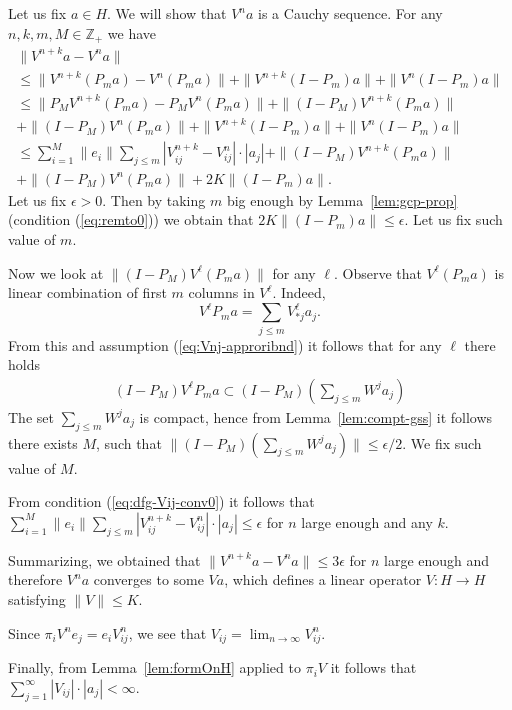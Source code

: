 Let us fix $a \in H$. We will show that $V^n a$ is a Cauchy sequence. For any $n,k,m,M \in \mathbb{Z}_+$ we have
\begin{multline*}
  \|V^{n+k}a - V^n a\|\\\leq
  \|V^{n+k} (P_m a) - V^{n} (P_m a) \| + \|V^{n+k} (I-P_m) a\| +  \|V^{n} (I-P_m) a\| \\
   \leq \|P_M V^{n+k} (P_m a) - P_MV^{n} (P_m a) \| + \|(I-P_M)V^{n+k} (P_m a) \| \\
    +  \|(I-P_M)V^{n} (P_m a) \|
    + \|V^{n+k} (I-P_m) a\| +  \|V^{n} (I-P_m) a\| \\
    \leq \sum_{i=1}^M \|e_i\| \sum_{j\leq m} |V^{n+k}_{ij}-V^n_{ij}| \cdot |a_j|   + \|(I-P_M)V^{n+k} (P_m a) \| \\
    +  \|(I-P_M)V^{n} (P_m a) \| + 2 K \|(I-P_m)a\|.
\end{multline*}
Let us fix $\epsilon >0$. Then by taking $m$ big enough by Lemma~\ref{lem:gcp-prop} (condition (\ref{eq:remto0})) we obtain
that $2 K \|(I-P_m)a\| \leq \epsilon$. Let us fix such value of $m$.


Now we look at  $\|(I-P_M)V^{\ell} (P_m a) \|$ for any $\ell$. Observe that  $V^{\ell} (P_m a)$ is linear combination
of first $m$ columns in $V^{\ell}$. Indeed,
\begin{equation*}
  V^{\ell}P_m a = \sum_{j \leq m} V^{\ell}_{\ast j} a_j.
\end{equation*}
From this and assumption (\ref{eq:Vnj-approribnd}) it follows that for any $\ell$ there holds
\begin{eqnarray*}
  (I-P_M)  V^{\ell}P_m a  \subset (I-P_M) \left( \sum_{j\leq m} W^j a_j \right)
\end{eqnarray*}
The set $\sum_{j\leq m} W^j a_j$ is compact, hence from Lemma~\ref{lem:compt-gss} it follows there exists $M$, such that $\|(I-P_M) \left( \sum_{j\leq m} W^j a_j \right)\| \leq \epsilon/2$. We fix such value of $M$.

From condition (\ref{eq:dfg-Vij-conv0}) it follows that $ \sum_{i=1}^M \|e_i\| \sum_{j\leq m} |V^{n+k}_{ij}-V^n_{ij}| \cdot |a_j| \leq \epsilon$ for $n$ large enough and any $k$.

Summarizing, we obtained that $\|V^{n+k}a - V^n a\|\leq 3 \epsilon$ for $n$ large enough and therefore
$V^n a$ converges to some $Va$, which defines a linear operator $V:H \to H$ satisfying $\|V\| \leq K.$

Since $\pi_i V^n e_j=e_i V^n_{ij}$, we see that $V_{ij}=\lim_{n \to \infty} V^n_{ij}$.

Finally, from Lemma~\ref{lem:formOnH} applied
to $\pi_i V$ it follows that  $\sum_{j=1}^\infty |V_{ij}| \cdot |a_j| < \infty$.

